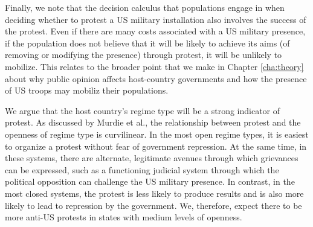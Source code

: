 		
		
		
		
		
		Finally, we note that the decision calculus that populations engage in when deciding whether to protest a US military installation also involves the success of the protest. Even if there are many costs associated with a US military presence, if the population does not believe that it will be likely to achieve its aims (of removing or modifying the presence) through protest, it will be unlikely to mobilize. This relates to the broader point that we make in Chapter \ref{cha:theory} about why public opinion affects host-country governments and how the presence of US troops may mobiliz their populations.
		
		We argue that the host country's regime type will be a strong indicator of protest. As discussed by Murdie et al., the relationship between protest and the openness of regime type is curvilinear.\cite{Murdie2015}  In the most open regime types, it is easiest to organize a protest without fear of government repression.  At the same time, in these systems, there are alternate, legitimate avenues through which grievances can be expressed, such as a functioning judicial system through which the political opposition can challenge the US military presence.\cite{Bitar2016} In contrast, in the most closed systems, the protest is less likely to produce results and is also more likely to lead to repression by the government. We, therefore, expect there to be more anti-US protests in states with medium levels of openness.
		
